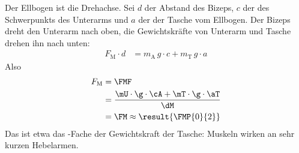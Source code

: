 Der Ellbogen ist die Drehachse. Sei $d$ der Abstand des Bizeps, $c$ der des Schwerpunkts des Unterarms und $a$ der der Tasche vom Ellbogen. Der Bizeps dreht den Unterarm nach oben, die Gewichtskräfte von Unterarm und Tasche drehen ihn nach unten:
\begin{align}
 F_\mathrm{M}\cdot d &= m_\mathrm{A}\,g\cdot c + m_\mathrm{T}\,g\cdot a
\end{align}
Also
\begin{align}
 F_\mathrm{M} &= \FMF \\
   &= \frac{\mU\cdot\g\cdot\cA+\mT\cdot\g\cdot\aT}{\dM} \\
   &= \FM \approx \result{\FMP{0}{2}}
\end{align}
Das ist etwa das -Fache der Gewichtskraft der Tasche: Muskeln wirken an sehr kurzen Hebelarmen.

